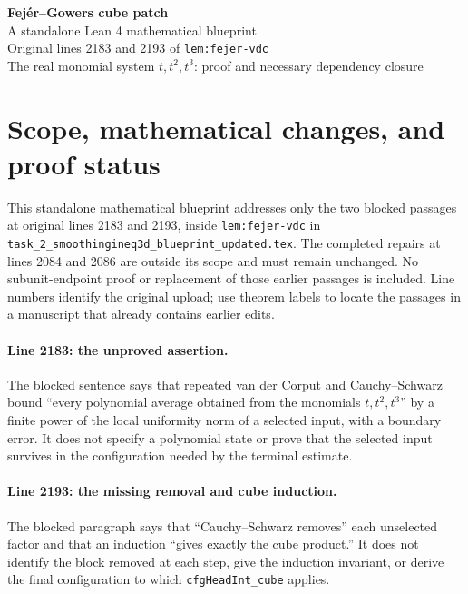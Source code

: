 \documentclass[11pt]{article}
\theoremstyle{definition}
\newcommand{\pid}[1]{\nolinkurl{#1}}
\begin{document}
\begin{center}
{\LARGE\bfseries Fej\'er--Gowers cube patch}\\[7pt]
{\large A standalone Lean 4 mathematical blueprint}\\[5pt]
{\normalsize Original lines 2183 and 2193 of \texttt{lem:fejer-vdc}}\\[8pt]
{\small The real monomial system $t,t^2,t^3$: proof and necessary dependency closure}
\end{center}
\vspace{0.4em}
\setcounter{tocdepth}{2}
\tableofcontents
\clearpage
\section*{Scope, mathematical changes, and proof status}
This standalone mathematical blueprint addresses only the two blocked passages at original
lines 2183 and 2193, inside \pid{lem:fejer-vdc} in
\pid{task_2_smoothingineq3d_blueprint_updated.tex}.
The completed repairs at lines 2084 and 2086 are outside its scope and must remain unchanged.
No subunit-endpoint proof or replacement of those earlier passages is included.
Line numbers identify the original upload; use theorem labels to locate the passages in a
manuscript that already contains earlier edits.

\paragraph{Line 2183: the unproved assertion.}
The blocked sentence says that repeated van der Corput and Cauchy--Schwarz bound
``every polynomial average obtained from the monomials $t,t^2,t^3$'' by a finite power of the
local uniformity norm of a selected input, with a boundary error.
It does not specify a polynomial state or prove that the selected input survives in the
configuration needed by the terminal estimate.

\paragraph{Line 2193: the missing removal and cube induction.}
The blocked paragraph says that ``Cauchy--Schwarz removes'' each unselected factor and that
an induction ``gives exactly the cube product.''
It does not identify the block removed at each step, give the induction invariant, or derive
the final configuration to which \pid{cfgHeadInt_cube} applies.
\end{document}
